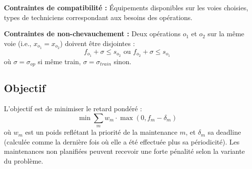 \textbf{Contraintes de compatibilité :}
Équipements disponibles sur les voies choisies, types de techniciens correspondant aux besoins des opérations.

\textbf{Contraintes de non-chevauchement :}
Deux opérations $o_1$ et $o_2$ sur la même voie (i.e., $x_{o_1} = x_{o_2}$) doivent être disjointes :
\begin{equation}
	f_{o_1} + \sigma \leq s_{o_2} \text{ ou } f_{o_2} + \sigma \leq s_{o_1}
\end{equation}
où $\sigma = \sigma_{op}$ si même train, $\sigma = \sigma_{train}$ sinon.

\subsection{Objectif}

L'objectif est de minimiser le retard pondéré :
\begin{equation}
	\min \sum_{m} w_m \cdot \max(0, f_m - \delta_m)
\end{equation}
où $w_m$ est un poids reflétant la priorité de la maintenance $m$, et $\delta_m$ sa deadline (calculée comme la dernière fois où elle a été effectuée plus sa périodicité). Les maintenances non planifiées peuvent recevoir une forte pénalité selon la variante du problème.
